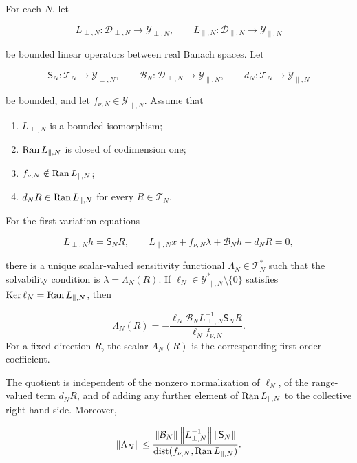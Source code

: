 \begin{theorem}
\label{thm:fredholm-reduction}
For each \(N\), let

\[
 L_{\perp,N}:\mathcal D_{\perp,N}\to\mathcal Y_{\perp,N},
 \qquad
 L_{\parallel,N}:\mathcal D_{\parallel,N}\to\mathcal Y_{\parallel,N}
\]

be bounded linear operators between real Banach spaces.  Let

\[
 \mathsf S_N:\mathcal T_N\to\mathcal Y_{\perp,N},
 \qquad
 \mathcal B_N:\mathcal D_{\perp,N}\to\mathcal Y_{\parallel,N},
 \qquad
 d_N:\mathcal T_N\to\mathcal Y_{\parallel,N}
\]

be bounded, and let \(f_{\nu,N}\in\mathcal Y_{\parallel,N}\).  Assume that

\begin{enumerate}[label=\textup{(F\arabic*)}]
 \item \(L_{\perp,N}\) is a bounded isomorphism;
 \item \(\operatorname{Ran} L_{\parallel,N}\) is closed of codimension one;
 \item \(f_{\nu,N}\notin\operatorname{Ran} L_{\parallel,N}\);
 \item \(d_NR\in\operatorname{Ran} L_{\parallel,N}\) for every \(R\in\mathcal T_N\).
\end{enumerate}

For the first-variation equations

\begin{equation}
 L_{\perp,N}h=\mathsf S_NR,
 \qquad
 L_{\parallel,N}x+f_{\nu,N}\lambda
      +\mathcal B_Nh+d_NR=0,
 \label{eq:fredholm-block-system}
\end{equation}

there is a unique scalar-valued sensitivity functional
\(\Lambda_N\in\mathcal T_N^*\) such
that the solvability condition is \(\lambda=\Lambda_N(R)\).  If
\(\ell_N\in\mathcal Y_{\parallel,N}^*\setminus\{0\}\) satisfies
\(\operatorname{Ker}\ell_N=\operatorname{Ran} L_{\parallel,N}\), then

\begin{equation}
 \Lambda_N(R)
 =-\frac{\ell_N\mathcal B_N
                 L_{\perp,N}^{-1}\mathsf S_NR}
          {\ell_Nf_{\nu,N}}.
 \label{eq:fredholm-lambda}
\end{equation}
For a fixed direction \(R\), the scalar \(\Lambda_N(R)\) is the corresponding
first-order coefficient.

The quotient is independent of the nonzero normalization of \(\ell_N\), of
the range-valued term \(d_NR\), and of adding any further element of
\(\operatorname{Ran} L_{\parallel,N}\) to the collective right-hand side.  Moreover,

\begin{equation}
 \left\lVert\Lambda_N\right\rVert
 \le
 \frac{\left\lVert\mathcal B_N\right\rVert
       \left\lVert L_{\perp,N}^{-1}\right\rVert
       \left\lVert\mathsf S_N\right\rVert}
 {\operatorname{dist}
    (f_{\nu,N},\operatorname{Ran} L_{\parallel,N})}.
 \label{eq:fredholm-lambda-bound}
\end{equation}
\end{theorem}

